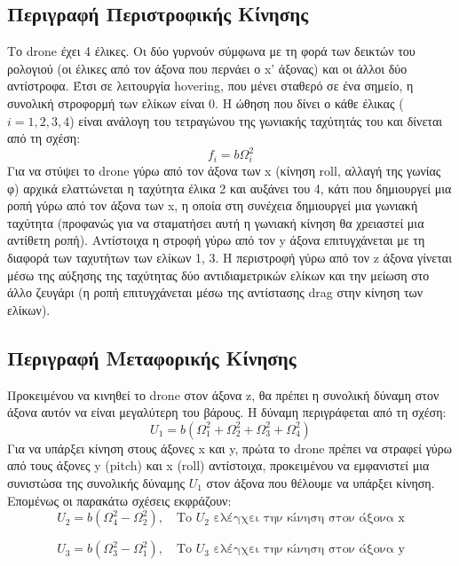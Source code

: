 \documentclass[a4paper,12pt]{article}
\begin{document}
\subsection{Περιγραφή Περιστροφικής Κίνησης}
Το drone έχει 4 έλικες. Οι δύο γυρνούν σύμφωνα με τη φορά των δεικτών του ρολογιού (οι 
έλικες από τον άξονα που περνάει ο x’ άξονας) και οι άλλοι δύο αντίστροφα. Έτσι σε 
λειτουργία hovering, που μένει σταθερό σε ένα σημείο, η συνολική στροφορμή των ελίκων 
είναι 0. Η ώθηση που δίνει ο κάθε έλικας ($i=1,2,3,4$) είναι ανάλογη του τετραγώνου της 
γωνιακής ταχύτητάς του και δίνεται από τη σχέση:
\begin{equation}
    f_i = b\Omega_i^2
\end{equation}
Για να στύψει το drone γύρω από τον άξονα των x (κίνηση roll, αλλαγή της γωνίας φ) αρχικά 
ελαττώνεται η ταχύτητα έλικα 2 και αυξάνει του 4, κάτι που δημιουργεί μια ροπή γύρω από 
τον άξονα των x, η οποία στη συνέχεια δημιουργεί μια γωνιακή ταχύτητα (προφανώς για να 
σταματήσει αυτή η γωνιακή κίνηση θα χρειαστεί μια αντίθετη ροπή). Αντίστοιχα η στροφή 
γύρω από τον y άξονα επιτυγχάνεται με τη διαφορά των ταχυτήτων των ελίκων 1, 3. Η 
περιστροφή γύρω από τον z άξονα γίνεται μέσω της αύξησης της ταχύτητας δύο 
αντιδιαμετρικών ελίκων και την μείωση στο άλλο ζευγάρι (η ροπή επιτυγχάνεται μέσω της 
αντίστασης drag στην κίνηση των ελίκων).  
\subsection{Περιγραφή Μεταφορικής Κίνησης}
Προκειμένου να κινηθεί το drone στον άξονα z, θα πρέπει η συνολική δύναμη στον άξονα αυτόν να είναι μεγαλύτερη του βάρους. Η δύναμη περιγράφεται από τη σχέση:
\begin{equation}
    U_1 = b(\Omega_1^2+\Omega_2^2+\Omega_3^2+\Omega_4^2)
\end{equation}
Για να υπάρξει κίνηση στους άξονες x και y, πρώτα το drone πρέπει να στραφεί γύρω από τους άξονες y (pitch) και x (roll) αντίστοιχα, προκειμένου να εμφανιστεί μια συνιστώσα της συνολικής δύναμης $U_1$ στον άξονα που θέλουμε να υπάρξει κίνηση. Επομένως οι παρακάτω σχέσεις εκφράζουν:
\begin{equation}
    U_2 = b(\Omega_4^2 - \Omega_2^2),  \quad \textrm{Το $U_2$ ελέγχει την κίνηση στον άξονα x}
\end{equation}

\begin{equation}
    U_3 = b(\Omega_3^2 - \Omega_1^2),  \quad \textrm{Το $U_3$ ελέγχει την κίνηση στον άξονα y}
\end{equation}
\end{document}
